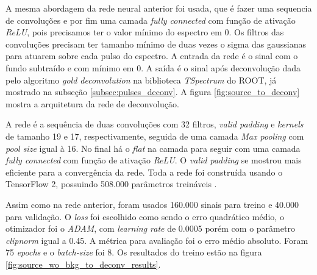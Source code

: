 \documentclass[a4paper,12pt,oneside]{book}
\begin{document}


\par A mesma abordagem da rede neural anterior foi usada, que é fazer uma sequencia de convoluções e por fim uma camada \textit{fully connected} com função de ativação \textit{ReLU}, pois precisamos ter o valor mínimo do espectro em 0. Os filtros das convoluções precisam ter tamanho mínimo de duas vezes o sigma das gaussianas para atuarem sobre cada pulso do espectro. A entrada da rede é o sinal com o fundo subtraído e com mínimo em 0. A saída é o sinal após deconvolução dada pelo algoritmo \textit{gold deconvolution} na biblioteca \textit{TSpectrum} do ROOT, já mostrado na subseção \ref{subsec:pulses_deconv}. A figura \ref{fig:source_to_deconv} mostra a arquitetura da rede de deconvolução.

\par A rede é a sequência de duas convoluções com 32 filtros, \textit{valid padding} e \textit{kernels} de tamanho 19 e 17, respectivamente, seguida de uma camada \textit{Max pooling} com \textit{pool size} igual à 16. No final há o \textit{flat} na camada para seguir com uma camada \textit{fully connected} com função de ativação \textit{ReLU}. O \textit{valid padding} se mostrou mais eficiente para a convergência da rede. Toda a rede foi construída usando o TensorFlow 2, possuindo 508.000 parâmetros treináveis \cite{FORTINO2022166497}.

\par Assim como na rede anterior, foram usados 160.000 sinais para treino e 40.000 para validação. O \textit{loss} foi escolhido como sendo o erro quadrático médio, o otimizador foi o \textit{ADAM}, com \textit{learning rate} de 0.0005 porém com o parâmetro \textit{clipnorm} igual a 0.45. A métrica para avaliação foi o erro médio absoluto. Foram 75 \textit{epochs} e o \textit{batch-size} foi 8. Os resultados do treino estão na figura \ref{fig:source_wo_bkg_to_deconv_results}.
\end{document}
